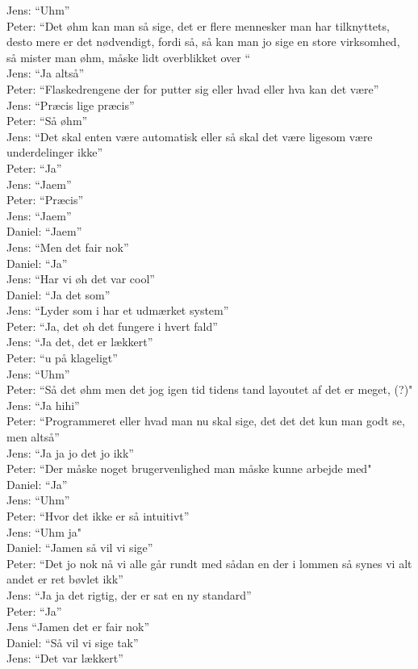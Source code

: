 Jens: “Uhm”\\
Peter: “Det øhm kan man så sige, det er flere mennesker man har tilknyttets, desto mere er det nødvendigt, fordi så, så kan man jo sige en store virksomhed, så mister man øhm, måske lidt overblikket over “\\
Jens: “Ja altså”\\
Peter: “Flaskedrengene der for putter sig eller hvad eller hva kan det være”\\
Jens: “Præcis lige præcis”\\
Peter: “Så øhm”\\
Jens: “Det skal enten være automatisk eller så skal det være ligesom være underdelinger ikke”\\
Peter: “Ja”\\
Jens: “Jaem”\\
Peter: “Præcis”\\
Jens: “Jaem”\\
Daniel: “Jaem”\\
Jens: “Men det fair nok”\\
Daniel: “Ja”\\
Jens: “Har vi øh det var cool”\\
Daniel: “Ja det som”\\
Jens: “Lyder som i har et udmærket system”\\
Peter: “Ja, det øh det fungere i hvert fald”\\
Jens: “Ja det, det er lækkert”\\
Peter: “u på klageligt”\\
Jens: “Uhm”\\
Peter: “Så det øhm men det jog igen tid tidens tand layoutet af det er meget, (?)"\\ 
Jens: “Ja hihi”\\
Peter: “Programmeret eller hvad man nu skal sige, det det det kun man godt se, men altså”\\
Jens: “Ja ja jo det jo ikk”\\
Peter: “Der måske noget brugervenlighed man måske kunne arbejde med"\\
Daniel: “Ja”\\
Jens: “Uhm”\\
Peter: “Hvor det ikke er så intuitivt”\\
Jens: “Uhm ja"\\
Daniel: “Jamen så vil vi sige”\\
Peter: “Det jo nok nå vi alle går rundt med sådan en der i lommen så synes vi alt andet er ret bøvlet ikk”\\
Jens: “Ja ja det rigtig, der er sat en ny standard”\\
Peter: “Ja”\\
Jens “Jamen det er fair nok”\\
Daniel: “Så vil vi sige tak”\\
Jens: “Det var lækkert”\\